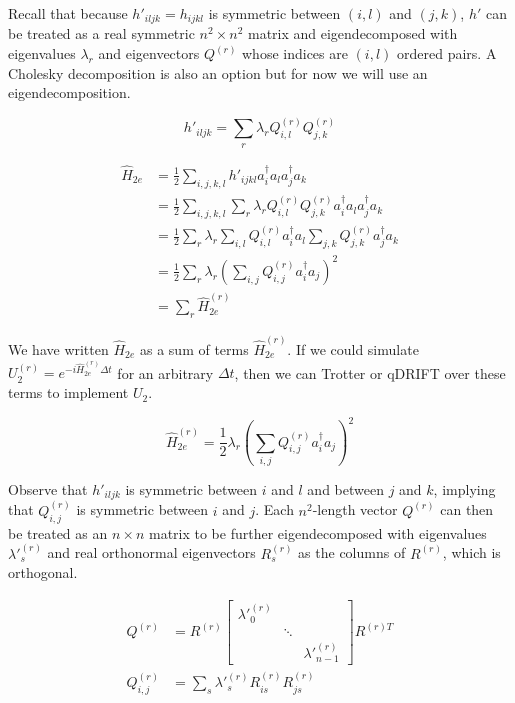 Recall that because $h'_{iljk} = h_{ijkl}$ is symmetric between $(i, l)$ and $(j, k)$, $h'$ can be treated as a real symmetric $n^2 \times n^2$ matrix and eigendecomposed with eigenvalues $\lambda_r$ and eigenvectors $Q^{(r)}$ whose indices are $(i, l)$ ordered pairs. A Cholesky decomposition is also an option but for now we will use an eigendecomposition.

\begin{equation}
    h'_{iljk} = \sum_r \lambda_r Q^{(r)}_{i, l}Q^{(r)}_{j, k}
\end{equation}

\begin{equation}
    \begin{split}
        \hat{H}_{2e} &= \frac{1}{2}\sum_{i,j,k,l} h'_{ijkl}a^\dag_ia_la^\dag_ja_k \\
        &= \frac{1}{2}\sum_{i,j,k,l} \sum_r \lambda_r Q^{(r)}_{i, l}Q^{(r)}_{j, k}a^\dag_ia_la^\dag_ja_k \\
        &= \frac{1}{2}\sum_r \lambda_r \sum_{i,l} Q^{(r)}_{i, l}a^\dag_ia_l\sum_{j,k}Q^{(r)}_{j, k}a^\dag_ja_k \\
        &= \frac{1}{2}\sum_r\lambda_r\left(\sum_{i,j} Q^{(r)}_{i, j}a^\dag_ia_j\right)^2 \\
        &= \sum_r \hat{H}_{2e}^{(r)}
    \end{split}
    \label{eq: DF}
\end{equation}

We have written $\hat{H}_{2e}$ as a sum of terms $\hat{H}_{2e}^{(r)}$. If we could simulate $U_2^{(r)} = e^{-i\hat{H}_{2e}^{(r)}\Delta t}$ for an arbitrary $\Delta t$, then we can Trotter or qDRIFT over these terms to implement $U_2$.

\begin{equation}
    \hat{H}_{2e}^{(r)} = \frac{1}{2}\lambda_r\left(\sum_{i,j} Q^{(r)}_{i, j}a^\dag_ia_j\right)^2
\end{equation}

Observe that $h'_{iljk}$ is symmetric between $i$ and $l$ and between $j$ and $k$, implying that $Q^{(r)}_{i, j}$ is symmetric between $i$ and $j$. Each $n^2$-length vector $Q^{(r)}$ can then be treated as an $n \times n$ matrix to be further eigendecomposed with eigenvalues $\lambda'^{(r)}_s$ and real orthonormal eigenvectors $R^{(r)}_s$ as the columns of $R^{(r)}$, which is orthogonal.

\begin{equation}
    \begin{split}
        Q^{(r)} &= R^{(r)}\begin{bmatrix}
            \lambda'^{(r)}_0 & & \\ & \ddots & \\ & & \lambda'^{(r)}_{n - 1}
          \end{bmatrix}R^{(r)T} \\
        Q^{(r)}_{i, j} &= \sum_s \lambda'^{(r)}_s R^{(r)}_{is}R^{(r)}_{js}
    \end{split}
\end{equation}

